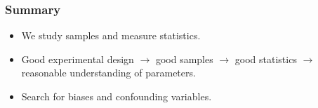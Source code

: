 \documentclass{beamer}
\begin{document}
\begin{frame}
  \frametitle{Summary}
  \begin{itemize}
    \item[] We study samples and measure statistics. 
      \vspace{0.5cm}
    \item[] Good experimental design $\rightarrow$ good samples
      $\rightarrow$ good statistics $\rightarrow$ reasonable
      understanding of parameters.
      \vspace{0.5cm}
    \item[] Search for biases and confounding variables. 
  \end{itemize}
\end{frame}
\end{document}
